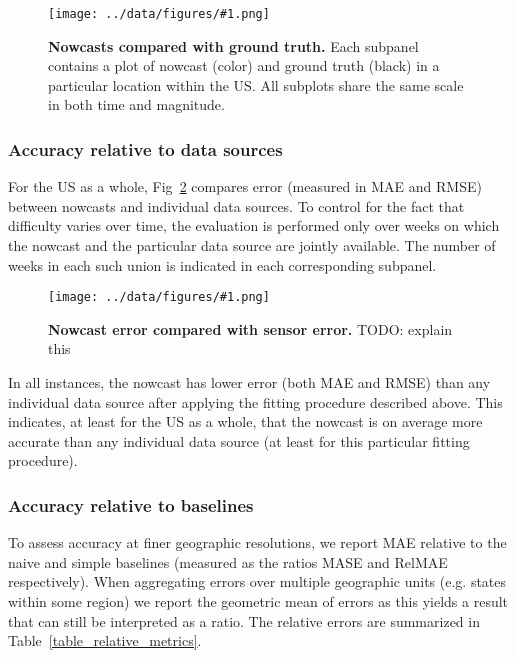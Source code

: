 \documentclass[10pt,letterpaper]{article}
\newcommand{\maybeincludegraphics}[1]{\texttt{[image: ../data/figures/\#1.png]}}
\begin{document}
\begin{figure}[!ht]
  \maybeincludegraphics{all_nowcasts}
  \caption{
    {\bf Nowcasts compared with ground truth.}
    Each subpanel contains a plot of nowcast (color) and ground truth (black)
    in a particular location within the US. All subplots share the same scale
    in both time and magnitude.
  }
  \label{figure_all_nowcasts}
\end{figure}

\subsubsection*{Accuracy relative to data sources}

For the US as a whole, Fig~\ref{figure_accuracy_vs_sensors} compares error
(measured in MAE and RMSE) between nowcasts and individual data sources. To
control for the fact that difficulty varies over time, the evaluation is
performed only over weeks on which the nowcast and the particular data source
are jointly available. The number of weeks in each such union is indicated in
each corresponding subpanel.

\begin{figure}[!ht]
  \maybeincludegraphics{accuracy_vs_sensors}
  \caption{
    {\bf Nowcast error compared with sensor error.}
    TODO: explain this
  }
  \label{figure_accuracy_vs_sensors}
\end{figure}

In all instances, the nowcast has lower error (both MAE and RMSE) than any
individual data source after applying the fitting procedure described above. This
indicates, at least for the US as a whole, that the nowcast is on average more
accurate than any individual data source (at least for this particular fitting
procedure).

\subsubsection*{Accuracy relative to baselines}

To assess accuracy at finer geographic resolutions, we report MAE relative to
the naive and simple baselines (measured as the ratios MASE and RelMAE
respectively). When aggregating errors over multiple geographic units (e.g.
states within some region) we report the geometric mean of errors as this
yields a result that can still be interpreted as a ratio. The relative errors
are summarized in Table~\ref{table_relative_metrics}.
\end{document}
